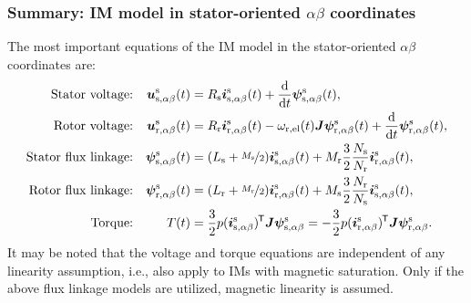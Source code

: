 \begin{frame}
	\frametitle{Summary: IM model in stator-oriented $\alpha\beta$ coordinates}
    The most important equations of the IM model in the stator-oriented $\alpha\beta$ coordinates are:
    \begin{equation*}
        \begin{alignedat}{4}
            &&\mbox{Stator voltage:}&& \quad\bm{u}^\mathrm{s}_\mathrm{s,\alpha\beta}(&t) &&= R_\mathrm{s} \bm{i}^\mathrm{s}_\mathrm{s,\alpha\beta}(t)+ \frac{\mathrm{d}}{\mathrm{d}t}\bm{\psi}^\mathrm{s}_\mathrm{s,\alpha\beta}(t),\\
            &&\mbox{Rotor voltage:}&& \quad\bm{u}^\mathrm{s}_\mathrm{r,\alpha\beta}(&t) &&= R_\mathrm{r} \bm{i}^\mathrm{s}_\mathrm{r,\alpha\beta}(t)-\omega_\mathrm{r,el}(t)\bm{J}\bm{\psi}^\mathrm{s}_\mathrm{r,\alpha\beta}(t) +\frac{\mathrm{d}}{\mathrm{d}t}\bm{\psi}^\mathrm{s}_\mathrm{r,\alpha\beta}(t),\\
            &&\mbox{Stator flux linkage:}&& \quad \bm{\psi}^\mathrm{s}_\mathrm{s,\alpha\beta}(&t) &&= (L_\mathrm{s} +\nicefrac{M_\mathrm{s}}{2}) \bm{i}^\mathrm{s}_{\mathrm{s},\alpha\beta}(t) +  M_{\mathrm{r}}\frac{3}{2}\frac{N_\mathrm{s}}{N_\mathrm{r}} \bm{i}^\mathrm{s}_{\mathrm{r},\alpha\beta}(t),\\
            &&\mbox{Rotor flux linkage:}&& \quad \bm{\psi}^\mathrm{s}_\mathrm{r,\alpha\beta}(&t) &&= (L_\mathrm{r} +\nicefrac{M_\mathrm{r}}{2}) \bm{i}^\mathrm{s}_{\mathrm{r},\alpha\beta}(t) +  M_{\mathrm{s}}\frac{3}{2}\frac{N_\mathrm{r}}{N_\mathrm{s}} \bm{i}^\mathrm{s}_{\mathrm{s},\alpha\beta}(t),\\
            &&\mbox{Torque:}&& \quad T(&t) &&= \frac{3}{2} p (\bm{i}_\mathrm{s,\alpha\beta}^\mathrm{s})^{\mkern-1.5mu\mathsf{T}}\bm{J}\bm{\psi}_\mathrm{s,\alpha\beta}^\mathrm{s}=-\frac{3}{2} p (\bm{i}^\mathrm{s}_\mathrm{r,\alpha\beta})^{\mkern-1.5mu\mathsf{T}}\bm{J}\bm{\psi}^\mathrm{s}_\mathrm{r,\alpha\beta}. 
        \end{alignedat}
    \end{equation*}
    \pause
    It may be noted that the voltage and torque equations are independent of any linearity assumption, i.e., also apply to IMs with magnetic saturation. Only if the above flux linkage models are utilized, magnetic linearity is assumed.
\end{frame}

